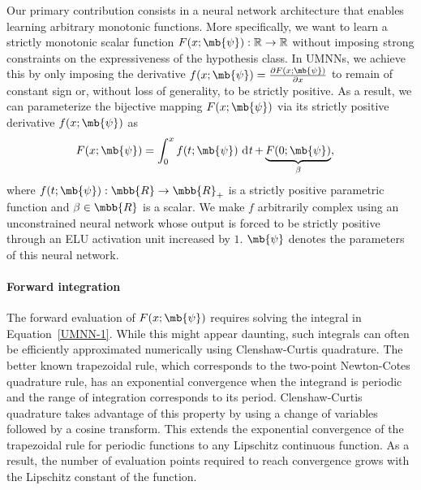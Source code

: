 Our primary contribution consists in a neural network architecture that enables learning arbitrary monotonic functions.
More specifically, we want to learn a strictly monotonic scalar function $F(x; \mb{\psi}): \mathbb{R}\rightarrow\mathbb{R}$ without imposing strong constraints on the expressiveness of the hypothesis class.
In UMNNs, we achieve this by only imposing the derivative $f(x; \mb{\psi}) = \tfrac{\partial F(x; \mb{\psi})}{\partial x}$ to remain of constant sign or, without loss of generality, to be strictly positive.
As a result, we can parameterize the bijective mapping $F(x; \mb{\psi})$ via its strictly positive derivative $f(x; \mb{\psi})$ as
\begin{align}
    F(x; \mb{\psi}) &= \int^x_0 f(t; \mb{\psi}) \dt + \underbrace{F(0; \mb{\psi})}_{\beta},\label{UMNN-1}%
\end{align}
where $f(t; \mb{\psi}): \mbb{R}\rightarrow\mbb{R}_+$ is a strictly positive parametric function and $\beta \in \mbb{R}$ is a scalar. We make $f$ arbitrarily complex using an unconstrained neural network whose output is forced to be strictly positive through an ELU activation unit increased by $1$. $\mb{\psi}$ denotes the parameters of this neural network.

\paragraph{Forward integration}
The forward evaluation of $F(x; \mb{\psi})$ requires solving the integral in Equation~\eqref{UMNN-1}. While this might appear daunting, such integrals can often be efficiently approximated numerically using Clenshaw-Curtis quadrature.
The better known trapezoidal rule, which corresponds to the two-point Newton-Cotes quadrature rule, has an exponential convergence when the integrand is periodic and the range of integration corresponds to its period. Clenshaw-Curtis quadrature takes advantage of this property by using a change of variables followed by a cosine transform. This extends the exponential convergence of the trapezoidal rule for periodic functions to any Lipschitz continuous function.
As a result, the number of evaluation points required to reach convergence grows with the Lipschitz constant of the function.

